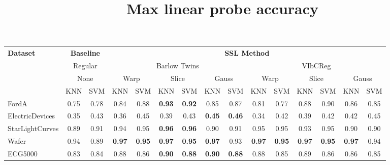 \documentclass[../../thesis.tex]{subfiles}
\begin{document}
\begin{table}[h!]
    \centering
    \title{Max linear probe accuracy}
    \begin{adjustbox}{width=\textwidth}
    \begin{tabular}{lcc|cc|cc|cc|cc|cc|cc} %
        \toprule
        \multirow{4}{*}{\textbf{Dataset}} & \multicolumn{2}{c}{\textbf{Baseline}} & \multicolumn{12}{c}{\textbf{SSL Method}} \\
                                            \cmidrule(lr){2-3} \cmidrule(lr){4-15}
                                          & \multicolumn{2}{c}{Regular}           & \multicolumn{6}{c}{Barlow Twins}                                                 &  \multicolumn{6}{c}{VIbCReg} \\
                                          \cmidrule(lr){2-3} \cmidrule(lr){4-9} \cmidrule(lr){10-15}
                                          &   \multicolumn{2}{c}{None}            & \multicolumn{2}{c}{Warp}  & \multicolumn{2}{c}{Slice} & \multicolumn{2}{c}{Gauss} & \multicolumn{2}{c}{Warp} & \multicolumn{2}{c}{Slice} & \multicolumn{2}{c}{Gauss} \\
                                          \cmidrule(lr){2-3} \cmidrule(lr){4-5} \cmidrule(lr){6-7} \cmidrule(lr){8-9} \cmidrule(lr){10-11} \cmidrule(lr){12-13}\cmidrule(lr){14-15}
                                          & KNN & SVM                               & KNN & SVM                  & KNN & SVM                & KNN & SVM                 & KNN & SVM                 & KNN & SVM                 & KNN & SVM   \\
        \midrule
        FordA                   & 0.75 & 0.78 & 0.84 & 0.88 & \textbf{0.93} & \textbf{0.92} & 0.85 & 0.87 & 0.81 & 0.77 & 0.88 & 0.90 & 0.86 & 0.85 \\
        ElectricDevices         & 0.35 & 0.43 & 0.36 & 0.45 & 0.39 & 0.43 & \textbf{0.45} & \textbf{0.46} & 0.34 & 0.42 & 0.39 & 0.42 & 0.42 & 0.45 \\
        StarLightCurves         & 0.89 & 0.91 & 0.94 & 0.95 & \textbf{0.96} & \textbf{0.96} & 0.90 & 0.91 & 0.95 & 0.95 & 0.93 & 0.95 & 0.90 & 0.90 \\
        Wafer                   & 0.94 & 0.89 &\textbf{ 0.97} & \textbf{0.95} & \textbf{0.97} & \textbf{0.95} & \textbf{0.97} & 0.93 & \textbf{0.97} & \textbf{0.95} & \textbf{0.97} & \textbf{0.95} & \textbf{0.97} & 0.94 \\
        ECG5000                 & 0.83 & 0.84 & 0.88 & 0.86 & \textbf{0.90} & \textbf{0.88} & \textbf{0.90} & \textbf{0.88} & 0.88 & 0.85 & 0.89 & 0.86 & 0.86 & 0.85 \\

\end{tabular}
\end{adjustbox}
\end{table}
\end{document}
